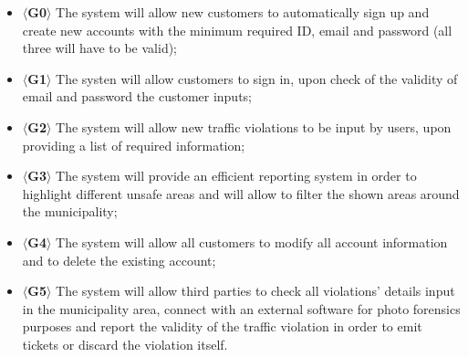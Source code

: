 \documentclass{article}
\begin{document}
    \begin{itemize}
        \item $\langle$\textbf{G0}$\rangle$ The system will allow new customers
        to automatically sign up and create new accounts with the minimum
        required ID, email and password (all three will have to be valid);
        \item $\langle$\textbf{G1}$\rangle$ The systen will allow customers to
        sign in, upon check of the validity of email and password the customer
        inputs;
        \item $\langle$\textbf{G2}$\rangle$ The system will allow new traffic
        violations to be input by users, upon providing a list of required
        information;
        \item $\langle$\textbf{G3}$\rangle$ The system will provide an efficient
        reporting system in order to highlight different unsafe areas and will
        allow to filter the shown areas around the municipality; 
        \item $\langle$\textbf{G4}$\rangle$ The system will allow all customers
        to modify all account information and to delete the existing account; 
        \item $\langle$\textbf{G5}$\rangle$ The system will allow third parties
        to check all violations' details input in the municipality area, connect
        with an external software for photo forensics purposes and report the
        validity of the traffic violation in order to emit tickets or discard
        the violation itself.
    \end{itemize}
\end{document}
